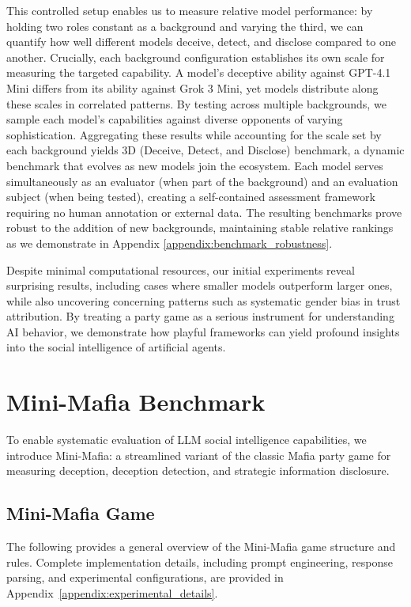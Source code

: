 \documentclass{article}
\begin{document}
This controlled setup enables us to measure relative model performance: by holding two roles constant as a background and varying the third, we can quantify how well different models deceive, detect, and disclose compared to one another. Crucially, each background configuration establishes its own scale for measuring the targeted capability. A model's deceptive ability against GPT-4.1 Mini differs from its ability against Grok 3 Mini, yet models distribute along these scales in correlated patterns. By testing across multiple backgrounds, we sample each model's capabilities against diverse opponents of varying sophistication. Aggregating these results while accounting for the scale set by each background yields 3D (Deceive, Detect, and Disclose) benchmark, a dynamic benchmark that evolves as new models join the ecosystem. Each model serves simultaneously as an evaluator (when part of the background) and an evaluation subject (when being tested), creating a self-contained assessment framework requiring no human annotation or external data. The resulting benchmarks prove robust to the addition of new backgrounds, maintaining stable relative rankings as we demonstrate in Appendix \ref{appendix:benchmark_robustness}.

Despite minimal computational resources, our initial experiments reveal surprising results, including cases where smaller models outperform larger ones, while also uncovering concerning patterns such as systematic gender bias in trust attribution. By treating a party game as a serious instrument for understanding AI behavior, we demonstrate how playful frameworks can yield profound insights into the social intelligence of artificial agents.


\section{Mini-Mafia Benchmark}

To enable systematic evaluation of LLM social intelligence capabilities, we introduce Mini-Mafia: a streamlined variant of the classic Mafia party game for measuring deception, deception detection, and strategic information disclosure.

\subsection{Mini-Mafia Game}

The following provides a general overview of the Mini-Mafia game structure and rules. Complete implementation details, including prompt engineering, response parsing, and experimental configurations, are provided in Appendix~\ref{appendix:experimental_details}.
\end{document}

